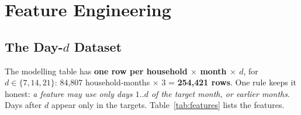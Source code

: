 \documentclass[11pt,letterpaper]{article}
\begin{document}
\section{Feature Engineering}
\label{sec:features}

\subsection{The \texorpdfstring{Day-$d$}{Day-d} Dataset}
\label{sec:dataset}

The modelling table has \textbf{one row per household $\times$ month $\times$ $d$}, for $d \in \{7, 14, 21\}$:
84,807 household-months $\times$ 3 = \textbf{254,421 rows}. One rule keeps it honest: \emph{a feature may use
only days $1..d$ of the target month, or earlier months}. Days after $d$ appear only in the targets.
Table~\ref{tab:features} lists the features.
\end{document}
